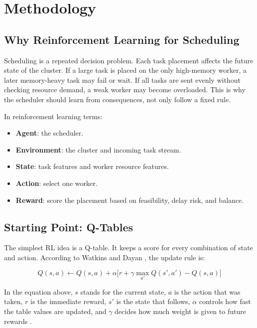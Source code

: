 \chapter{Methodology}
\label{section:methodology}



\section{Why Reinforcement Learning for Scheduling}

Scheduling is a repeated decision problem. Each task placement affects the future state of the cluster. If a large task is placed on the only high-memory worker, a later memory-heavy task may fail or wait. If all tasks are sent evenly without checking resource demand, a weak worker may become overloaded. This is why the scheduler should learn from consequences, not only follow a fixed rule.

In reinforcement learning terms:

\begin{itemize}
    \item \textbf{Agent}: the scheduler.
    \item \textbf{Environment}: the cluster and incoming task stream.
    \item \textbf{State}: task features and worker resource features.
    \item \textbf{Action}: select one worker.
    \item \textbf{Reward}: score the placement based on feasibility, delay risk, and balance.
\end{itemize}

\section{Starting Point: Q-Tables}

The simplest RL idea is a Q-table. It keeps a score for every combination of state and action. According to Watkins and Dayan \cite{watkins1992qlearning}, the update rule is:

\[
Q(s,a) \leftarrow Q(s,a) + \alpha \bigl[r + \gamma \max_{a'} Q(s',a') - Q(s,a)\bigr]
\]

In the equation above, \(s\) stands for the current state, \(a\) is the action that was taken, \(r\) is the immediate reward, \(s'\) is the state that follows, \(\alpha\) controls how fast the table values are updated, and \(\gamma\) decides how much weight is given to future rewards \cite{watkins1992qlearning}.

